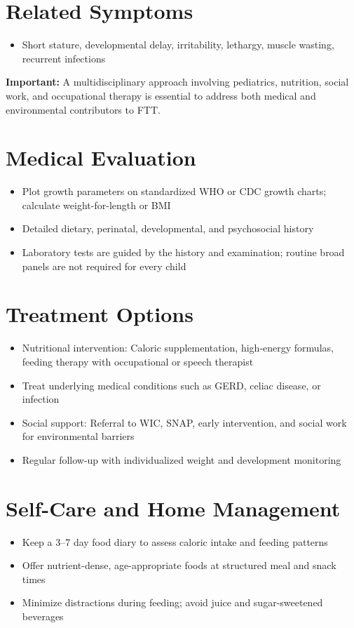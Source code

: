 \section*{Related Symptoms}
\begin{itemize}
  \item Short stature, developmental delay, irritability, lethargy, muscle wasting, recurrent infections
\end{itemize}
\textbf{Important:} A multidisciplinary approach involving pediatrics, nutrition, social work, and occupational therapy is essential to address both medical and environmental contributors to FTT.

\section*{Medical Evaluation}
\begin{itemize}
  \item Plot growth parameters on standardized WHO or CDC growth charts; calculate weight-for-length or BMI
  \item Detailed dietary, perinatal, developmental, and psychosocial history
  \item Laboratory tests are guided by the history and examination; routine broad panels are not required for every child
\end{itemize}

\section*{Treatment Options}
\begin{itemize}
  \item Nutritional intervention: Caloric supplementation, high-energy formulas, feeding therapy with occupational or speech therapist
  \item Treat underlying medical conditions such as GERD, celiac disease, or infection
  \item Social support: Referral to WIC, SNAP, early intervention, and social work for environmental barriers
  \item Regular follow-up with individualized weight and development monitoring
\end{itemize}

\section*{Self-Care and Home Management}
\begin{itemize}
  \item Keep a 3--7 day food diary to assess caloric intake and feeding patterns
  \item Offer nutrient-dense, age-appropriate foods at structured meal and snack times
  \item Minimize distractions during feeding; avoid juice and sugar-sweetened beverages
\end{itemize}

